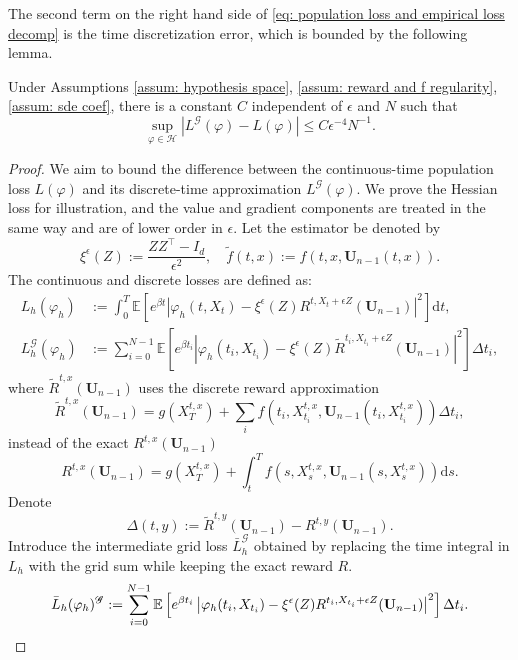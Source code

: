 \documentclass[twoside,11pt]{article}
\newcommand{\dd}{\mathrm{d}}
\newcommand{\E}{\mathbb{E}}
\newcommand{\bU}{\mathbf{U}}
\newcommand{\cH}{\mathcal{H}}
\newcommand{\1}{\mathbf{1}}
\numberwithin{equation}{section}
\begin{document}
The second term on the right hand side of \eqref{eq: population loss and empirical loss decomp} is the time discretization error, which is bounded by the following lemma.
\begin{lemma}\label{lemma: discretization error}
Under Assumptions \ref{assum: hypothesis space}, \ref{assum: reward and f regularity}, \ref{assum: sde coef}, there is a constant $ C$ independent of $ \epsilon$ and $ N$ such that
\begin{equation}
    \sup_{\varphi \in \cH} \left|  L^{\mathscr{G}}(\varphi) - L(\varphi)\right| \le C \epsilon^{-4}N^{-1}.
\end{equation}
\end{lemma}
\begin{proof}
    We aim to bound the difference between the continuous-time population loss $L(\varphi)$ and its discrete-time approximation $L^{\mathcal{G}}(\varphi)$. We prove the Hessian loss for illustration, and the value and gradient components are treated in the same way and are of lower order in $\epsilon$. Let the estimator be denoted by
\begin{equation}
    \xi^\epsilon(Z) := \frac{ZZ^\top - I_d}{\epsilon^2},\quad \tilde f(t,x):=f(t,x,\mathbf U_{n-1}(t,x)).
\end{equation}
The continuous and discrete losses are defined as:
\begin{align}
    L_h(\varphi_h) &:=  \int_0^T \E \left[ e^{\beta t} \left| \varphi_h(t, X_t) - \xi^\epsilon(Z)R^{t, X_t+\epsilon Z}(\mathbf{U}_{n-1}) \right|^2 \right] \dd t, \\
    L_h^{\mathcal{G}}(\varphi_h) &:=  \sum_{i=0}^{N-1} \E \left[ e^{\beta t_i} \left| \varphi_h(t_i, X_{t_i}) - \xi^\epsilon(Z) \tilde R^{t_i, X_{t_i}+\epsilon Z}(\mathbf{U}_{n-1}) \right|^2 \right] \Delta t_i,
\end{align}
where $\tilde R^{t,x}(\bU_{n-1})$ uses the discrete reward approximation
\begin{equation}
    \tilde R^{t,x}(\bU_{n-1}) = g(X_T^{t,x}) + \sum_i f(t_i,X_{t_i}^{t,x},\bU_{n-1}(t_i,X_{t_i}^{t,x}))\Delta t_i,
\end{equation}
instead of the exact $R^{t,x}(\bU_{n-1})$
\begin{equation}
    R^{t,x}(\bU_{n-1}) = g(X_T^{t,x}) + \int_t^{T} f(s,X_s^{t,x},\bU_{n-1}(s,X_{s}^{t,x}))\dd s.
\end{equation}
Denote
\[
    \Delta(t,y)
    :=
    \tilde R^{t,y}(\mathbf U_{n-1})
    -
    R^{t,y}(\mathbf U_{n-1}).
\]
Introduce the intermediate grid loss $\bar L_h^{\mathscr G}$ obtained by
replacing the time integral in $L_h$ with the grid sum while keeping the exact
reward $R$.
\begin{equation}
    \Bar{L}_h(\varphi_h)^{\mathscr{G}} :=   \sum_{i=0}^{N-1} \E \left[ e^{\beta t_i} \left| \varphi_h(t_i, X_{t_i}) - \xi^\epsilon(Z)  R^{t_i, X_{t_i}+\epsilon Z}(\mathbf{U}_{n-1}) \right|^2 \right] \Delta t_i.
\end{equation}


\end{proof}
\end{document}
